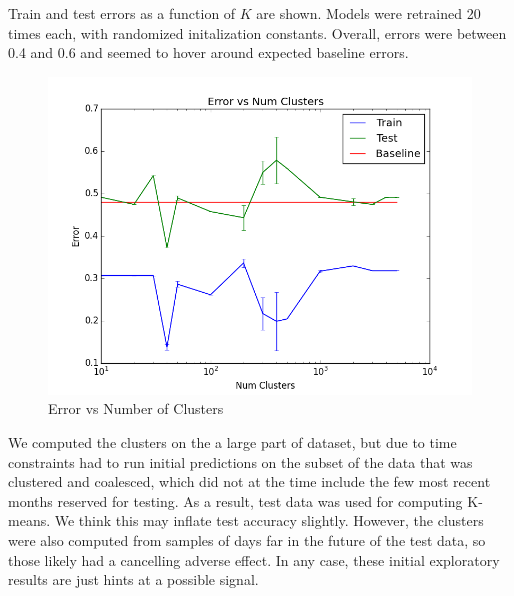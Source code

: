 Train and test errors as a function of $K$ are shown. Models were retrained 20 times each, with randomized initalization constants. Overall, errors were between 0.4 and 0.6 and seemed to hover around expected baseline errors. 


\begin{figure}[ht]
\vskip 0.2in
\begin{center}
\centerline{\includegraphics[scale=0.15]{images/error_v_k.png}}
\caption{Error vs Number of Clusters}
\end{center}
\vskip -0.2in
\label{fig:error_v_k}
\end{figure} 

We computed the clusters on the a large part of dataset, but due to time constraints had to run initial predictions on the subset of the data that was clustered and coalesced, which did not at the time include the few most recent months reserved for testing. As a result, test data was used for computing K-means. We think this may inflate test accuracy slightly. However, the clusters were also computed from samples of days far in the future of the test data, so those likely had a cancelling adverse effect. In any case, these initial exploratory results are just hints at a possible signal.
